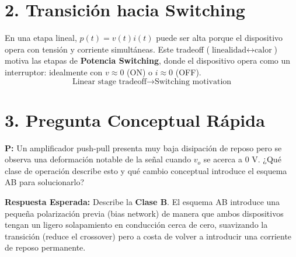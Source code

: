 \documentclass[11pt, a4paper]{article}
\begin{document}
\section*{2. Transición hacia Switching}
En una etapa lineal, $p(t) = v(t)i(t)$ puede ser alta porque el dispositivo opera con tensión y corriente simultáneas. Este tradeoff ($\text{linealidad} \leftrightarrow \text{calor}$) motiva las etapas de \textbf{Potencia Switching}, donde el dispositivo opera como un interruptor: idealmente con $v\approx0$ (ON) o $i\approx0$ (OFF).
\[
\text{Linear stage tradeoff} \longrightarrow \text{Switching motivation}
\]

\section*{3. Pregunta Conceptual Rápida}
\textbf{P:} Un amplificador push-pull presenta muy baja disipación de reposo pero se observa una deformación notable de la señal cuando $v_o$ se acerca a 0 V. ¿Qué clase de operación describe esto y qué cambio conceptual introduce el esquema AB para solucionarlo?

\vspace{0.2cm}
\textbf{Respuesta Esperada:} 
Describe la \textbf{Clase B}. El esquema AB introduce una pequeña polarización previa (bias network) de manera que ambos dispositivos tengan un ligero solapamiento en conducción cerca de cero, suavizando la transición (reduce el crossover) pero a costa de volver a introducir una corriente de reposo permanente.
\end{document}
